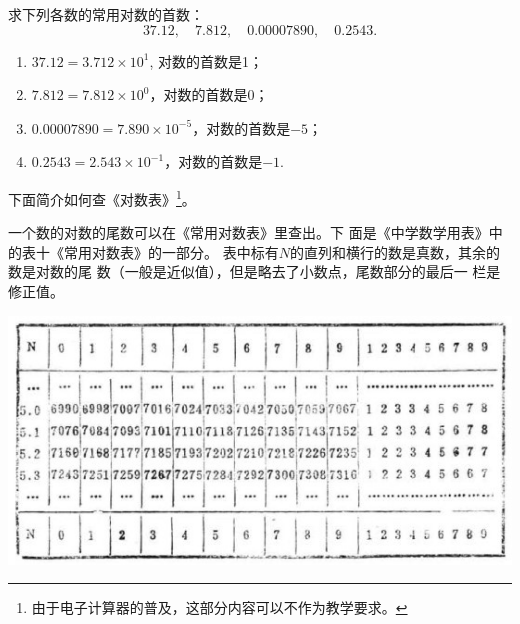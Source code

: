 \begin{example}
    求下列各数的常用对数的首数：
\[37.12,\quad 7.812,\quad 0.00007890,\quad 0.2543.\]
\end{example}

\begin{solution}
\begin{enumerate}
    \item $37.12=3.712\times 10^1$, 对数的首数是1；
    \item   $7.812=7.812\times 10^0$，对数的首数是0；
    \item $0.00007890=7.890\times 10^{-5}$，对数的首数是$-5$；
    \item   $0.2543=2.543\times 10^{-1}$，对数的首数是$-1$.
\end{enumerate}
\end{solution}

下面简介如何查《对数表》\footnote{由于电子计算器的普及，这部分内容可以不作为教学要求。}。

一个数的对数的尾数可以在《常用对数表》里查出。下
面是《中学数学用表》中的表十《常用对数表》的一部分。
表中标有$N$的直列和横行的数是真数，其余的数是对数的尾
数（一般是近似值），但是略去了小数点，尾数部分的最后一
栏是修正值。

\begin{center}
    \includegraphics[scale=.8]{fig/1.jpg}
\end{center}


